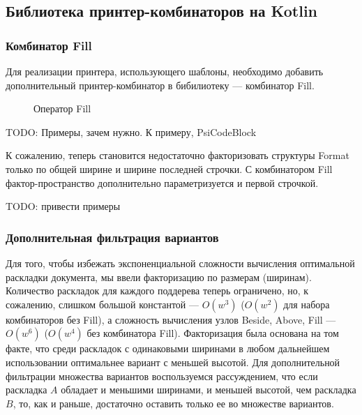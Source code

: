 \subsection{Библиотека принтер-комбинаторов на Kotlin}

\subsubsection{Комбинатор Fill}

Для реализации принтера, использующего шаблоны, необходимо добавить
дополнительный принтер-комбинатор в бибилиотеку --- комбинатор Fill.

\begin{figure}[h!]
  \centering
	\quad
	\caption{Оператор Fill}
\end{figure}

TODO: Примеры, зачем нужно. К примеру, PsiCodeBlock

К сожалению, теперь становится недостаточно факторизовать структуры Format
только по общей ширине и ширине последней строчки.
С комбинатором Fill фактор-пространство дополнительно параметризуется и первой
строчкой.

TODO: привести примеры

\subsubsection{Дополнительная фильтрация вариантов}

Для того, чтобы избежать экспоненциальной сложности вычисления оптимальной
раскладки документа, мы ввели факторизацию по размерам (ширинам).
Количество раскладок для каждого поддерева теперь ограничено, но, к сожалению,
слишком большой константой --- $O(w^3)$ ($O(w^2)$ для набора комбинаторов без
Fill), а сложность вычисления узлов Beside, Above, Fill --- $O(w^6)$
($O(w^4)$ без комбинатора Fill). Факторизация была основана на том факте, что
среди раскладок с одинаковыми ширинами в любом дальнейшем использовании
оптимальнее вариант с меньшей высотой. Для дополнительной фильтрации множества
вариантов воспользуемся рассуждением, что если раскладка $A$ обладает и
меньшими ширинами, и меньшей высотой, чем раскладка $B$, то, как и раньше,
достаточно оставить только ее во множестве вариантов.

